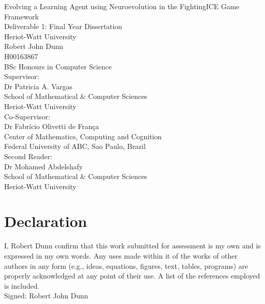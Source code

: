 \documentclass[11pt,a4paper]{article}
\begin{document}
{
\centering
\vspace{10mm}
{\huge Evolving a Learning Agent using Neuroevolution in the FightingICE Game Framework}\\
\vspace{20mm}
{\large Deliverable 1: Final Year Dissertation}\\
{\large Heriot-Watt University}\\
\vspace{10mm}
{\large Robert John Dunn\\
H00163867\\
BSc Honours in Computer Science\\
}
\vspace{10mm}
{\large Supervisor:}\\
Dr Patricia A. Vargas\\
School of Mathematical \& Computer Sciences\\
Heriot-Watt University
\vspace{3mm}\\
{\large Co-Supervisor:}\\
Dr Fabrício Olivetti de França\\
Center of Mathematics, Computing and Cognition\\
Federal University of ABC, Sao Paulo, Brazil
\vspace{3mm}\\
Second Reader:\\
Dr Mohamed Abdelshafy\\
School of Mathematical \& Computer Sciences\\
Heriot-Watt University\\}
\newpage
\thispagestyle{empty}
\vspace*{30mm}
\section*{Declaration}
I,  Robert Dunn confirm that this work submitted for assessment is my own and is expressed
in my own words. Any uses made within it of the works of other authors in any
form (e.g., ideas, equations, figures, text, tables, programs) are properly acknowledged
at any point of their use. A list of the references employed is included.\\

Signed: Robert John Dunn\\
\end{document}
